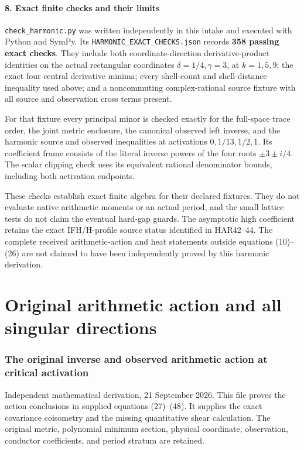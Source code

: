 \documentclass[11pt]{article}
\begin{document}
\subsection{8. Exact finite checks and their limits}\label{exact-finite-checks-and-their-limits}

\nolinkurl{check_harmonic.py} was written independently in this intake and executed with Python and SymPy. Its \nolinkurl{HARMONIC_EXACT_CHECKS.json} records \textbf{358 passing exact checks}. They include both coordinate-direction derivative-product identities on the actual rectangular coordinates \(\delta=1/4,\gamma=3\), at \(k=1,5,9\); the exact four central derivative minima; every shell-count and shell-distance inequality used above; and a noncommuting complex-rational source fixture with all source and observation cross terms present.

For that fixture every principal minor is checked exactly for the full-space trace order, the joint metric enclosure, the canonical observed left inverse, and the harmonic source and observed inequalities at activations \(0,1/13,1/2,1\). Its coefficient frame consists of the literal inverse powers of the four roots \(\pm3\pm i/4\). The scalar clipping check uses its equivalent rational denominator bounds, including both activation endpoints.

These checks establish exact finite algebra for their declared fixtures. They do not evaluate native arithmetic moments or an actual period, and the small lattice tests do not claim the eventual hard-gap guards. The asymptotic high coefficient retains the exact IFH/H-profile source status identified in HAR42--44. The complete received arithmetic-action and heat statements outside equations (10)--(26) are not claimed to have been independently proved by this harmonic derivation.


\clearpage\part{Original arithmetic action and all singular directions}
\section{The original inverse and observed arithmetic action at critical activation}\label{the-original-inverse-and-observed-arithmetic-action-at-critical-activation}

Independent mathematical derivation, 21 September 2026. This file proves the action conclusions in supplied equations (27)--(48). It supplies the exact covariance coisometry and the missing quantitative shear calculation. The original metric, polynomial minimum section, physical coordinate, observation, conductor coefficients, and period stratum are retained.
\end{document}
